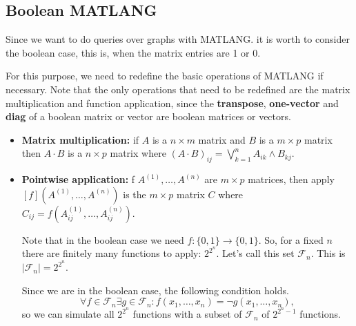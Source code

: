 \subsection{Boolean MATLANG}

Since we want to do queries over graphs with MATLANG. it is worth to consider the boolean case, this is, when the matrix entries are 1 or 0.

For this purpose, we need to redefine the basic operations of MATLANG if necessary. Note that the only operations that need to be redefined are the matrix multiplication and function application, since the \textbf{transpose}, \textbf{one-vector} and \textbf{diag} of a boolean matrix or vector are boolean matrices or vectors.

\begin{itemize}
	\item \textbf{Matrix multiplication:} if $A$ is a $n\times m$ matrix and $B$ is a $m\times p$ matrix then $A\cdot B$ is a $n\times p$ matrix where $(A\cdot B)_{ij}=\bigvee_{k=1}^n A_{ik}\wedge B_{kj}$.
	\item \textbf{Pointwise application:} f $A^{(1)}, \ldots, A^{(n)}$ are $m\times p$ matrices, then apply$\left[ f \right](A^{(1)}, \ldots, A^{(n)})$ is the $m\times p$ matrix $C$ where $C_{ij}=f(A^{(1)}_{ij}, \ldots, A^{(n)}_{ij})$.
	
	Note that in the boolean case we need $f:\lbrace 0,1\rbrace\rightarrow\lbrace 0,1\rbrace$. So, for a fixed $n$ there are finitely many functions to apply: $2^{2^n}$. Let's call this set $\mathcal{F}_n$. This is $|\mathcal{F}_n|=2^{2^{n}}$.
	
	Since we are in the boolean case, the following condition holds. $$\forall f\in\mathcal{F}_n\exists g\in\mathcal{F}_n: f(x_{1}, \ldots, x_{n}) = \neg g(x_{1}, \ldots, x_{n}),$$ so we can simulate all $2^{2^n}$ functions with a subset of $\mathcal{F}_n$ of $2^{2^n - 1}$ functions.
\end{itemize}